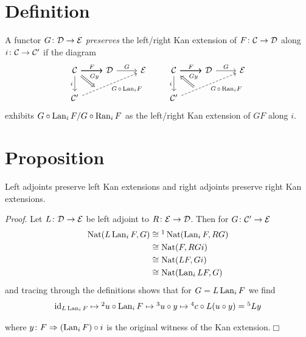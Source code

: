     \section{Definition}
        A functor $G \colon \mathcal{D} \to \mathcal{E}$ \emph{preserves} the left/right Kan extension of $F \colon \mathcal{C} \to \mathcal{D}$ along $i \colon \mathcal{C} \to \mathcal{C}'$ if the diagram
        \begin{equation*}
            \begin{tikzcd}
                \Cc \arrow[r] \arrow[d, "i"'] \arrow[r, "F"] \arrow[r] \arrow[rd, Rightarrow, shorten >=2em, "Gy", near start] & \Dd \arrow[r, "G"] & \Ee \\
                \Cc' \arrow[rru, "G \, \circ \, \mathrm{Lan}_i F"', dashed]                & {}            & 
            \end{tikzcd}
            \qquad
            \begin{tikzcd}
                \Cc \arrow[r] \arrow[d, "i"'] \arrow[r, "F"] \arrow[r] \arrow[rd, Leftarrow, shorten >=2em, "Gy", near start] & \Dd \arrow[r, "G"] & \Ee \\
                \Cc' \arrow[rru, "G \, \circ \, \mathrm{Ran}_i F"', dashed]                & {}            & 
            \end{tikzcd}
        \end{equation*}
        exhibits $G \circ \operatorname{Lan}_i F / G \circ \operatorname{Ran}_i F$ as the left/right Kan extension of $GF$ along $i$.
    \section{Proposition}\label{chI-30}
        Left adjoints preserve left Kan extensions and right adjoints preserve right Kan extensions.
        \smallskip

        \emph{Proof}. Let $L \colon \mathcal{D} \to \mathcal{E}$ be left adjoint to $R \colon \mathcal{E} \to \mathcal{D}$. Then for $G \colon \mathcal{C}' \to \mathcal{E}$
        \begin{align*}
            \Nat(L \Lan_i F, G) &\cong\footnotemark \Nat(\Lan_i F, RG) \\
                                &\cong \Nat(F, RGi) \\
                                &\cong \Nat(LF, Gi) \\
                                &\cong \Nat(\Lan_i LF, G)
        \end{align*}
        and tracing through the definitions shows that for $G = L \operatorname{Lan}_i F$ we find
        \begin{equation*}
            \id_{L \Lan_i F} \mapsto\footnotemark u \circ \Lan_i F \mapsto\footnotemark u \circ y \mapsto\footnotemark c \circ L(u \circ y) =\footnotemark Ly
        \end{equation*}
        \addtocounter{footnote}{-4}
        where $y \colon F \Rightarrow (\operatorname{Lan}_i F) \circ i$ is the original witness of the Kan extension.\hfill\(\Box\)
